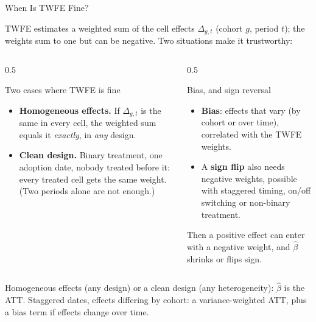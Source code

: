 \documentclass[main.tex]{subfiles}
\begin{document}
\begin{frame}{When Is TWFE Fine?}

  TWFE estimates a \alert{weighted sum} of the cell effects $\Delta_{g,t}$
  (cohort $g$, period $t$); the weights sum to one but \alert{can be negative}.
  Two situations make it trustworthy:

  \medskip
  \begin{columns}[T]
    \begin{column}{0.5\textwidth}
      \begin{block}{Two cases where TWFE is fine}
        \begin{itemize}
          \item \textbf{Homogeneous effects.} If $\Delta_{g,t}$ is the same in
            every cell, the weighted sum equals it \emph{exactly}, in
            \emph{any} design.
          \item \textbf{Clean design.} Binary treatment, one adoption date,
            nobody treated before it: every treated cell gets the \alert{same}
            weight. (Two periods alone are not enough.)
        \end{itemize}
      \end{block}
    \end{column}
    \begin{column}{0.5\textwidth}
      \begin{alertblock}{Bias, and sign reversal}
        \begin{itemize}
          \item \textbf{Bias}: effects that vary (by cohort or over
            time), correlated with the TWFE weights.
          \item A \textbf{sign flip} also needs negative weights,
            possible with staggered timing, on/off switching
            or non-binary treatment.
        \end{itemize}
        Then a positive effect can enter with a negative weight, and
        $\hat\beta$ shrinks or flips sign.
      \end{alertblock}
    \end{column}
  \end{columns}

  \medskip
  \footnotesize Homogeneous effects (any design) or a clean design (any
  heterogeneity): $\hat\beta$ is the ATT. Staggered dates, effects differing by
  cohort: a variance-weighted ATT, plus a bias term if effects change over time.

\end{frame}
\end{document}
